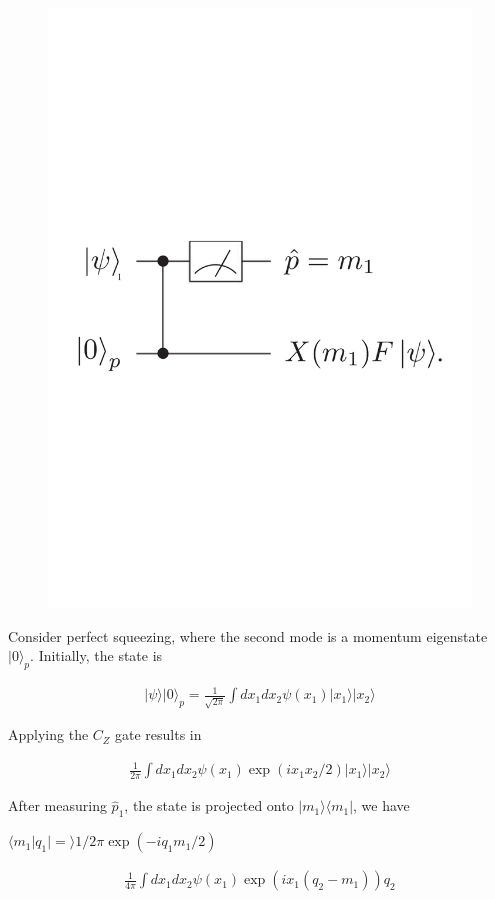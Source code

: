 \documentclass[pra,
superscriptaddress,
 amsmath,amssymb,
 aps,twocolumn]{revtex4-1}
\newcommand{\bra}[1]{\langle{#1}|}
\newcommand{\ket}[1]{|{#1}\rangle}
\newcommand{\braket}[2]{\langle{#1}|{#2}\rangle}
\begin{document}
\begin{figure}
\includegraphics[trim = 0cm 10cm 0cm 10cm, clip, width=0.75\linewidth]{one_qubit_teleport.pdf}
\caption{\label{fig:cluster_Teleport}}
\end{figure}

 Consider perfect squeezing, where the second mode is a momentum eigenstate $\ket{0}_p$. Initially, the state is 


\begin{eqnarray}
\ket{\psi}\ket{0}_p = \frac{1}{\sqrt {2\pi}} \int dx_1 dx_2 \psi(x_1)\ket{x_1}\ket{x_2}
\end{eqnarray} 

Applying the $C_Z$ gate results in


\begin{eqnarray}
\frac{1}{2\pi} \int dx_1 dx_2 \psi(x_1) \exp(i x_1 x_2/2)\ket{x_1}\ket{x_2}
\end{eqnarray}

After measuring $\hat p_1$, the state is projected onto $\ket{m_1}\bra{m_1}$, we have

$\braket{m_1|q_1}= 1/2\pi \exp(-iq_1 m_1/2)$


\begin{eqnarray}
\frac{1}{4\pi}\int d x_1 d x_2 \psi(x_1) \exp(i x_1 (q_2 - m_1)) q_2
 \end{eqnarray}
 
\end{document}
